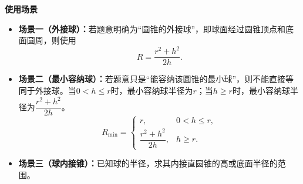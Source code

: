 \begin{explanationbox}
	\medskip
	\textbf{\textcolor{CExplanation}{使用场景}}
	\begin{itemize}[leftmargin=*, itemsep=0.5em, topsep=0.4em]
		\item \textbf{场景一（外接球）：}若题意明确为“圆锥的外接球”，即球面经过圆锥顶点和底面圆周，则使用
		      \[
			      R=\frac{r^2+h^2}{2h}.
		      \]
		\item \textbf{场景二（最小容纳球）：}若题意只是“能容纳该圆锥的最小球”，则不能直接等同于外接球。当$0<h\le r$时，最小容纳球半径为$r$；当$h\ge r$时，最小容纳球半径为$\dfrac{r^2+h^2}{2h}$。
		      \[
			      R_{\min}=\begin{cases}
				      r,                   & 0<h\le r, \\[4pt]
				      \dfrac{r^2+h^2}{2h}, & h\ge r.
			      \end{cases}
		      \]
		\item \textbf{场景三（球内接锥）：}已知球的半径，求其内接直圆锥的高或底面半径的范围。
	\end{itemize}
\end{explanationbox}